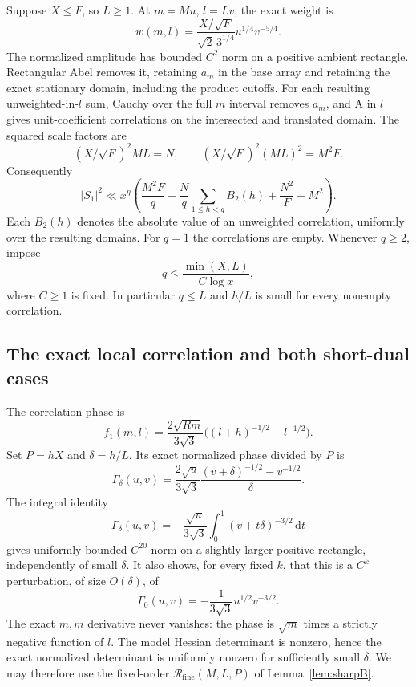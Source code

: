 \documentclass[11pt,a4paper]{article}
\numberwithin{equation}{section}
\theoremstyle{remark}
\newcommand{\dd}{\,\mathrm d}
\newcommand{\Rfine}{\mathcal R_{\mathrm{fine}}}
\begin{document}
Suppose $X\le F$, so $L\ge1$. At $m=Mu$, $l=Lv$, the exact weight is
\[
 w(m,l)=\frac{X/\sqrt F}{\sqrt2\,3^{1/4}}u^{1/4}v^{-5/4}.
\]
The normalized amplitude has bounded $C^2$ norm on a positive ambient
rectangle. Rectangular Abel removes it, retaining $a_m$ in the base array
and retaining the exact stationary domain, including the product cutoffs.
For each resulting unweighted-in-$l$ sum, Cauchy over the full $m$ interval
removes $a_m$, and A in $l$ gives unit-coefficient correlations on the
intersected and translated domain. The squared scale factors are
\[
 (X/\sqrt F)^2ML=N,\qquad
 (X/\sqrt F)^2(ML)^2=M^2F.
\]
Consequently
\begin{equation}\label{eq:caseB-A}
 |S_1|^2\ll x^\eta\left(
 \frac{M^2F}{q}+\frac Nq\sum_{1\le h<q}B_2(h)
          +\frac{N^2}{F}+M^2\right).
\end{equation}
Each $B_2(h)$ denotes the absolute value of an unweighted correlation,
uniformly over the resulting domains. For $q=1$ the correlations are
empty. Whenever $q\ge2$, impose
\begin{equation}\label{eq:caseB-cap}
 q\le\frac{\min(X,L)}{C\log x},
\end{equation}
where $C\ge1$ is fixed. In particular $q\le L$ and $h/L$ is small for
every nonempty correlation.

\subsection{The exact local correlation and both short-dual cases}
The correlation phase is
\begin{equation}\label{eq:caseB-correlation}
 f_1(m,l)=\frac{2\sqrt{Rm}}{3\sqrt3}
          \bigl((l+h)^{-1/2}-l^{-1/2}\bigr).
\end{equation}
Set $P=hX$ and $\delta=h/L$. Its exact normalized phase divided by $P$
is
\[
 \Gamma_\delta(u,v)=\frac{2\sqrt u}{3\sqrt3}
       \frac{(v+\delta)^{-1/2}-v^{-1/2}}{\delta}.
\]
The integral identity
\[
 \Gamma_\delta(u,v)
   =-\frac{\sqrt u}{3\sqrt3}\int_0^1(v+t\delta)^{-3/2}\dd t
\]
gives uniformly bounded $C^{20}$ norm on a slightly larger positive
rectangle, independently of small $\delta$. It also shows, for every
fixed $k$, that this is a $C^k$ perturbation, of size $O(\delta)$, of
\[
 \Gamma_0(u,v)=-\frac1{3\sqrt3}u^{1/2}v^{-3/2}.
\]
The exact $m,m$ derivative never vanishes: the phase is $\sqrt m$ times
a strictly negative function of $l$. The model Hessian determinant is
nonzero, hence the exact normalized determinant is uniformly nonzero
for sufficiently small $\delta$. We may therefore use the fixed-order
$\Rfine(M,L,P)$ of Lemma~\ref{lem:sharpB}.
\end{document}

